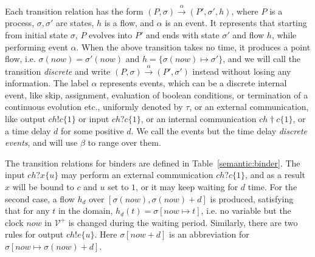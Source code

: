 \documentclass{llncs}
\newcommand{\leadm}[1]{\xrightarrow{#1}}
\newcommand{\now}{now}
\begin{document}
Each transition relation has the form $(P, \sigma) \leadm{\alpha} (P', \sigma', h)$,
where $P$ is a process, $\sigma, \sigma'$ are states, $h$ is a flow, and $\alpha$ is an event. It represents that
starting from initial state $\sigma$, $P$ evolves into $P'$ and ends with state $\sigma'$ and flow $h$, while
performing event $\alpha$. When the above transition takes no time, it produces a point flow,
i.e. $\sigma(now) = \sigma'(now)$ and
$h = \{\sigma(now) \mapsto \sigma'\}$, and we will call the transition \emph{discrete} and write
$(P, \sigma) \leadm{\alpha} (P', \sigma')$
instead without losing any information.
The label $\alpha$ represents
events, which can be a discrete internal event,
like skip, assignment, evaluation of boolean conditions, or termination of a continuous evolution etc.,
uniformly denoted by $\tau$, or an external communication, like output $ch!c\{1\}$ or input $ch?c\{1\}$,
or an internal communication $ch\dag c\{1\}$, or a time delay $d$ for some positive $d $.
We call the events but the time delay \emph{discrete events}, and will use $\beta$ to range over them.


The transition relations for binders are defined in Table~\ref{semantic:binder}.
The input $ch?x\{u\}$ may perform an external communication
$ch?c\{1\}$,  and as a result  $x$ will be
bound to $c$ and $u$ set to $1$, or
it may keep waiting for  $d $ time. For
the second case, a flow $h_d$ over $[\sigma(now), \sigma(now)+d]$ is produced, satisfying that
 for any $t$ in the domain, $h_d(t) = \sigma[now \mapsto t]$, i.e. no variable but the clock $now$ in $\mathcal{V}^+$
is changed during the waiting period. Similarly, there are two rules for output $ch!e\{u\}$. Here
 $\sigma[\now +d] $ is an abbreviation for $\sigma[\now \mapsto \sigma(\now)+d]$.
\end{document}
